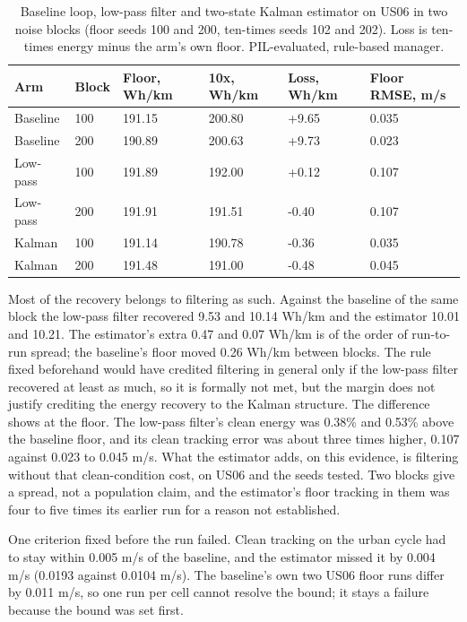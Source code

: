 \documentclass{ieeeaccess}
\begin{document}
\begin{table}[!t]
\centering
\caption{Baseline loop, low-pass filter and two-state Kalman estimator on US06 in two noise blocks (floor seeds 100 and 200, ten-times seeds 102 and 202). Loss is ten-times energy minus the arm's own floor. PIL-evaluated, rule-based manager.}
\label{tab:estimation-lowpass}
\footnotesize
\setlength{\tabcolsep}{3pt}
\renewcommand{\arraystretch}{1.15}
\begin{tabularx}{\columnwidth}{@{}XXXXXX@{}}
\hline
\textbf{Arm} & \textbf{Block} & \textbf{Floor, Wh/km} & \textbf{10x, Wh/km} & \textbf{Loss, Wh/km} & \textbf{Floor RMSE, m/s} \\
\hline
Baseline & 100 & 191.15 & 200.80 & +9.65 & 0.035 \\
Baseline & 200 & 190.89 & 200.63 & +9.73 & 0.023 \\
Low-pass & 100 & 191.89 & 192.00 & +0.12 & 0.107 \\
Low-pass & 200 & 191.91 & 191.51 & -0.40 & 0.107 \\
Kalman & 100 & 191.14 & 190.78 & -0.36 & 0.035 \\
Kalman & 200 & 191.48 & 191.00 & -0.48 & 0.045 \\
\hline
\end{tabularx}
\end{table}

Most of the recovery belongs to filtering as such. Against the baseline of the same block the low-pass filter recovered 9.53 and 10.14 Wh/km and the estimator 10.01 and 10.21. The estimator's extra 0.47 and 0.07 Wh/km is of the order of run-to-run spread; the baseline's floor moved 0.26 Wh/km between blocks. The rule fixed beforehand would have credited filtering in general only if the low-pass filter recovered at least as much, so it is formally not met, but the margin does not justify crediting the energy recovery to the Kalman structure. The difference shows at the floor. The low-pass filter's clean energy was 0.38\% and 0.53\% above the baseline floor, and its clean tracking error was about three times higher, 0.107 against 0.023 to 0.045 m/s. What the estimator adds, on this evidence, is filtering without that clean-condition cost, on US06 and the seeds tested. Two blocks give a spread, not a population claim, and the estimator's floor tracking in them was four to five times its earlier run for a reason not established.

One criterion fixed before the run failed. Clean tracking on the urban cycle had to stay within 0.005 m/s of the baseline, and the estimator missed it by 0.004 m/s (0.0193 against 0.0104 m/s). The baseline's own two US06 floor runs differ by 0.011 m/s, so one run per cell cannot resolve the bound; it stays a failure because the bound was set first.
\end{document}
